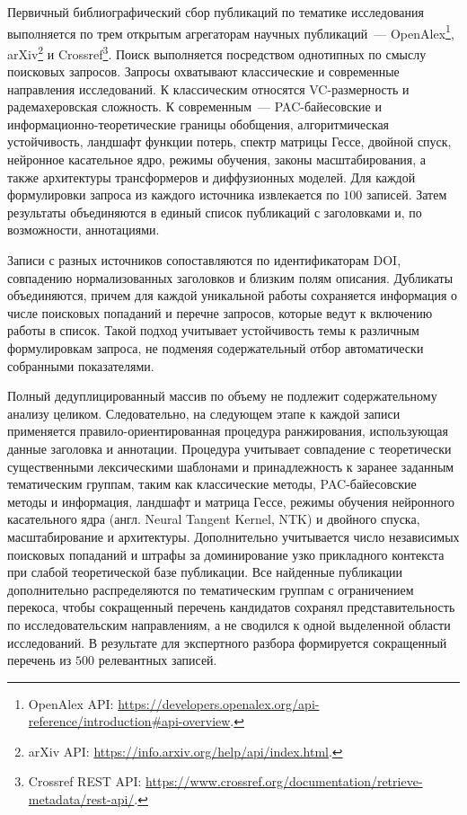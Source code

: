 Первичный библиографический сбор публикаций по тематике исследования выполняется по трем открытым агрегаторам научных публикаций~--- OpenAlex\footnote{OpenAlex API: \url{https://developers.openalex.org/api-reference/introduction\#api-overview}.}, arXiv\footnote{arXiv API: \url{https://info.arxiv.org/help/api/index.html}.} и Crossref\footnote{Crossref REST API: \url{https://www.crossref.org/documentation/retrieve-metadata/rest-api/}.}. Поиск выполняется посредством однотипных по смыслу поисковых запросов. Запросы охватывают классические и современные направления исследований.
К классическим относятся VC-размерность и радемахеровская сложность.
К современным~--- PAC-байесовские и информационно-теоретические границы обобщения, алгоритмическая устойчивость, ландшафт функции потерь, спектр матрицы Гессе, двойной спуск, нейронное касательное ядро, режимы обучения, законы масштабирования, а также архитектуры трансформеров и диффузионных моделей.
Для каждой формулировки запроса из каждого источника извлекается по $100$ записей. Затем результаты объединяются в единый список публикаций с заголовками и, по возможности, аннотациями.

Записи с разных источников сопоставляются по идентификаторам DOI, совпадению нормализованных заголовков и близким полям описания.
Дубликаты объединяются, причем для каждой уникальной работы сохраняется информация о числе поисковых попаданий и перечне запросов, которые ведут к включению работы в список.
Такой подход учитывает устойчивость темы к различным формулировкам запроса, не подменяя содержательный отбор автоматически собранными показателями.

Полный дедуплицированный массив по объему не подлежит содержательному анализу целиком.
Следовательно, на следующем этапе к каждой записи применяется правило-ориентированная процедура ранжирования, использующая данные заголовка и аннотации.
Процедура учитывает совпадение с теоретически существенными лексическими шаблонами и принадлежность к заранее заданным тематическим группам, таким как классические методы, PAC-байесовские методы и информация, ландшафт и матрица Гессе, режимы обучения нейронного касательного ядра (англ. Neural Tangent Kernel, NTK) и двойного спуска, масштабирование и архитектуры.
Дополнительно учитывается число независимых поисковых попаданий и штрафы за доминирование узко прикладного контекста при слабой теоретической базе публикации.
Все найденные публикации дополнительно распределяются по тематическим группам с ограничением перекоса, чтобы сокращенный перечень кандидатов сохранял представительность по исследовательским направлениям, а не сводился к одной выделенной области исследований.
В результате для экспертного разбора формируется сокращенный перечень из $500$ релевантных записей.

